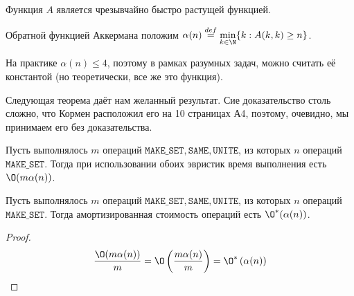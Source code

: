 Функция $A$ является чрезывчайно быстро растущей функцией.

\Def Обратной функцией Аккермана положим $\alpha(n) \overset{def}{=} \min\limits_{k \in \N} \{ k: A(k, k) \geq n  \}$.

На практике $\alpha(n) \leq 4$, поэтому в рамках разумных задач, можно считать её константой (но теоретически, все же это функция).

Следующая теорема даёт нам желанный результат. Сие доказательство столь сложно, что Кормен расположил его на 10 страницах А4, поэтому, очевидно, мы принимаем его без доказательства.

\ThBd Пусть выполнялось $m$ операций $\texttt{MAKE\_SET}, \texttt{SAME}, \texttt{UNITE}$, из которых $n$ операций $\texttt{MAKE\_SET}$. 
Тогда при использовании обоих эвристик время выполнения есть $\O(m \alpha(n))$.

\ConsBd Пусть выполнялось $m$ операций $\texttt{MAKE\_SET}, \texttt{SAME}, \texttt{UNITE}$, из которых $n$ операций $\texttt{MAKE\_SET}$. Тогда амортизированная стоимость операций есть $\O^*(\alpha(n))$.
\begin{proof}
    \begin{equation*}
        \frac{\O(m \alpha(n))}{m} = \O\left(\frac{m \alpha(n)}{m}\right) = \O^*\left(\alpha(n)\right)
    \end{equation*}
\end{proof}

